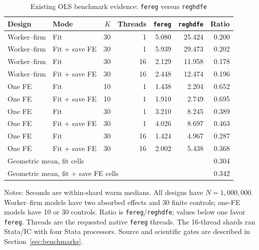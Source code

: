 \begin{table}[tbp]
\centering
\caption{Existing OLS benchmark evidence: \texttt{fereg} versus \texttt{reghdfe}}
\label{tab:bench-ols}
\small
\begin{threeparttable}
\begin{tabular}{llrrrrr}
\toprule
Design & Mode & $K$ & Threads & \texttt{fereg} & \texttt{reghdfe} & Ratio \\
\midrule
Worker--firm & Fit & 30 & 1 & 5.080 & 25.424 & 0.200 \\
Worker--firm & Fit + save FE & 30 & 1 & 5.939 & 29.473 & 0.202 \\
Worker--firm & Fit & 30 & 16 & 2.129 & 11.958 & 0.178 \\
Worker--firm & Fit + save FE & 30 & 16 & 2.448 & 12.474 & 0.196 \\
One FE & Fit & 10 & 1 & 1.438 & 2.204 & 0.652 \\
One FE & Fit + save FE & 10 & 1 & 1.910 & 2.749 & 0.695 \\
One FE & Fit & 30 & 1 & 3.210 & 8.245 & 0.389 \\
One FE & Fit + save FE & 30 & 1 & 4.026 & 8.697 & 0.463 \\
One FE & Fit & 30 & 16 & 1.424 & 4.967 & 0.287 \\
One FE & Fit + save FE & 30 & 16 & 2.002 & 5.438 & 0.368 \\
\midrule
\multicolumn{4}{l}{Geometric mean, fit cells} & \multicolumn{2}{r}{ } & 0.304 \\
\multicolumn{4}{l}{Geometric mean, fit + save FE cells} & \multicolumn{2}{r}{ } & 0.342 \\
\bottomrule
\end{tabular}
\begin{tablenotes}[flushleft]\footnotesize
\item Notes: Seconds are within-shard warm medians. All designs have $N=1{,}000{,}000$. Worker--firm models have two absorbed effects and 30 finite controls; one-FE models have 10 or 30 controls. Ratio is \texttt{fereg}/\texttt{reghdfe}; values below one favor \texttt{fereg}. Threads are the requested native \texttt{fereg} threads. The 16-thread shards ran Stata/IC with four Stata processors. Source and scientific gates are described in Section~\ref{sec:benchmarks}.
\end{tablenotes}
\end{threeparttable}
\end{table}

